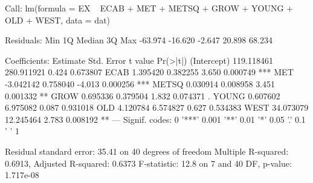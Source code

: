 \begin{Schunk}
\begin{Soutput}
Call:
lm(formula = EX ~ ECAB + MET + METSQ + GROW + YOUNG + OLD + WEST, 
    data = dat)

Residuals:
    Min      1Q  Median      3Q     Max 
-63.974 -16.620  -2.647  20.898  68.234 

Coefficients:
              Estimate Std. Error t value Pr(>|t|)    
(Intercept) 119.118461 280.911921   0.424 0.673807    
ECAB          1.395420   0.382255   3.650 0.000749 ***
MET          -3.042142   0.758040  -4.013 0.000256 ***
METSQ         0.030914   0.008958   3.451 0.001332 ** 
GROW          0.695336   0.379504   1.832 0.074371 .  
YOUNG         0.607602   6.975082   0.087 0.931018    
OLD           4.120784   6.574827   0.627 0.534383    
WEST         34.073079  12.245464   2.783 0.008192 ** 
---
Signif. codes:  0 '***' 0.001 '**' 0.01 '*' 0.05 '.' 0.1 ' ' 1

Residual standard error: 35.41 on 40 degrees of freedom
Multiple R-squared:  0.6913,	Adjusted R-squared:  0.6373 
F-statistic:  12.8 on 7 and 40 DF,  p-value: 1.717e-08
\end{Soutput}
\end{Schunk}
